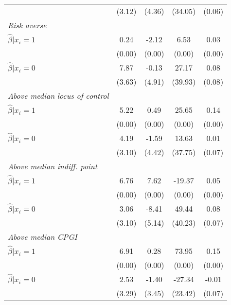 \begin{table}[h]
{\begin{threeparttable}
\begin{tabular}{l*{4}{c}}
                &   (3.12)&   (4.36)&  (34.05)&   (0.06)\\
\textit{Risk averse}&         &         &         &         \\
\hspace{0.5cm} \(\hat\beta|x_i=1\)&     0.24&    -2.12&     6.53&     0.03\\
                &   (0.00)&   (0.00)&   (0.00)&   (0.00)\\
\hspace{0.5cm} \(\hat\beta|x_i=0\)&7.87\sym{**}&    -0.13&    27.17&     0.08\\
                &   (3.63)&   (4.91)&  (39.93)&   (0.08)\\
\textit{Above median locus of control}&         &         &         &         \\
\hspace{0.5cm} \(\hat\beta|x_i=1\)&     5.22&     0.49&    25.65&     0.14\\
                &   (0.00)&   (0.00)&   (0.00)&   (0.00)\\
\hspace{0.5cm} \(\hat\beta|x_i=0\)&     4.19&    -1.59&    13.63&     0.01\\
                &   (3.10)&   (4.42)&  (37.75)&   (0.07)\\
\textit{Above median indiff. point}&         &         &         &         \\
\hspace{0.5cm} \(\hat\beta|x_i=1\)&     6.76&     7.62&   -19.37&     0.05\\
                &   (0.00)&   (0.00)&   (0.00)&   (0.00)\\
\hspace{0.5cm} \(\hat\beta|x_i=0\)&     3.06&    -8.41&    49.44&     0.08\\
                &   (3.10)&   (5.14)&  (40.23)&   (0.07)\\
\textit{Above median CPGI}&         &         &         &         \\
\hspace{0.5cm} \(\hat\beta|x_i=1\)&6.91\sym{*}&     0.28&    73.95&0.15\sym{*}\\
                &   (0.00)&   (0.00)&   (0.00)&   (0.00)\\
\hspace{0.5cm} \(\hat\beta|x_i=0\)&     2.53&    -1.40&   -27.34&    -0.01\\
                &   (3.29)&   (3.45)&  (23.42)&   (0.07)\\

\end{tabular}
\end{threeparttable}}
\end{table}
